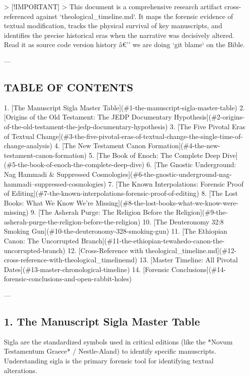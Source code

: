 \documentclass[aps,prd,11pt,onecolumn,superscriptaddress,nofootinbib,floatfix]{revtex4-2}
\begin{document}
> [!IMPORTANT]
> This document is a comprehensive research artifact cross-referenced against `theological\_timeline.md`. It maps the forensic evidence of textual modification, tracks the physical survival of key manuscripts, and identifies the precise historical eras when the narrative was decisively altered. Read it as source code version history â€'' we are doing `git blame` on the Bible.


---


\subsection{TABLE OF CONTENTS}


1. [The Manuscript Sigla Master Table](\#1-the-manuscript-sigla-master-table)
2. [Origins of the Old Testament: The JEDP Documentary Hypothesis](\#2-origins-of-the-old-testament-the-jedp-documentary-hypothesis)
3. [The Five Pivotal Eras of Textual Change](\#3-the-five-pivotal-eras-of-textual-change-the-single-time-of-change-analysis)
4. [The New Testament Canon Formation](\#4-the-new-testament-canon-formation)
5. [The Book of Enoch: The Complete Deep Dive](\#5-the-book-of-enoch-the-complete-deep-dive)
6. [The Gnostic Underground: Nag Hammadi \& Suppressed Cosmologies](\#6-the-gnostic-underground-nag-hammadi--suppressed-cosmologies)
7. [The Known Interpolations: Forensic Proof of Editing](\#7-the-known-interpolations-forensic-proof-of-editing)
8. [The Lost Books: What We Know We're Missing](\#8-the-lost-books-what-we-know-were-missing)
9. [The Asherah Purge: The Religion Before the Religion](\#9-the-asherah-purge-the-religion-before-the-religion)
10. [The Deuteronomy 32:8 Smoking Gun](\#10-the-deuteronomy-328-smoking-gun)
11. [The Ethiopian Canon: The Uncorrupted Branch](\#11-the-ethiopian-tewahedo-canon-the-uncorrupted-branch)
12. [Cross-Reference with theological\_timeline.md](\#12-cross-reference-with-theological\_timelinemd)
13. [Master Timeline: All Pivotal Dates](\#13-master-chronological-timeline)
14. [Forensic Conclusions](\#14-forensic-conclusions-and-open-rabbit-holes)


---


\subsection{1. The Manuscript Sigla Master Table}


Sigla are the standardized symbols used in critical editions (like the *Novum Testamentum Graece* / Nestle-Aland) to identify specific manuscripts. Understanding sigla is the primary forensic tool for identifying textual alterations.
\end{document}
